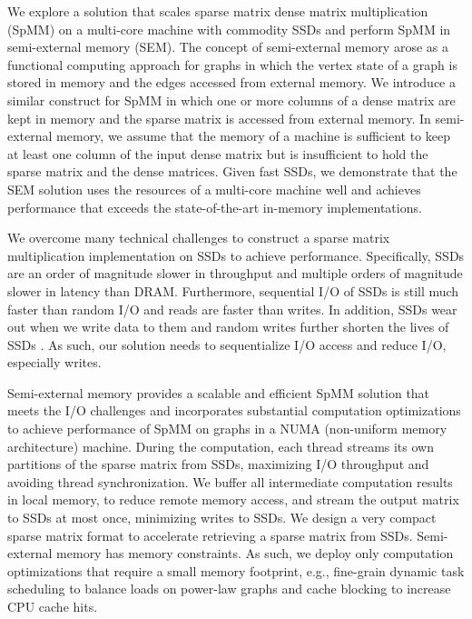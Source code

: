 We explore a solution that scales sparse matrix dense matrix multiplication
(SpMM) on a multi-core machine with commodity SSDs and
perform SpMM in semi-external memory (SEM). The concept of semi-external memory
arose as a functional computing approach for graphs \cite{Abello98} in which
the vertex state of a graph is stored in memory and the edges accessed from
external memory. We introduce a similar construct for SpMM in which one or more
columns of a dense matrix are kept in memory and the sparse matrix is accessed
from external memory. In semi-external memory, we assume
that the memory of a machine is sufficient to keep at least one column
of the input dense matrix but is insufficient to hold the sparse matrix
and the dense matrices. Given fast SSDs, we demonstrate that the SEM
solution uses the resources of a multi-core machine well and
achieves performance that exceeds the state-of-the-art in-memory implementations.


We overcome many technical challenges to construct a sparse matrix
multiplication implementation on SSDs to achieve performance. Specifically,
SSDs are an order of magnitude slower in throughput and multiple orders of
magnitude slower in latency than DRAM. Furthermore, sequential I/O of SSDs
is still much faster
than random I/O \cite{safs} and reads are faster than writes. In addition,
SSDs wear out when we write data to them and random writes further shorten
the lives of SSDs \cite{sfs}. As such, our solution needs to sequentialize
I/O access and reduce I/O, especially writes.

Semi-external memory provides a scalable and efficient SpMM solution that
meets the I/O challenges and incorporates substantial computation optimizations
to achieve performance of SpMM on graphs in a NUMA (non-uniform memory
architecture) machine. During the computation, each
thread streams its own partitions of the sparse matrix from SSDs, maximizing
I/O throughput and avoiding thread synchronization. We buffer all
intermediate computation results in local memory, to reduce remote memory
access, and stream the output matrix to SSDs at most once, minimizing writes
to SSDs. We design a very compact sparse matrix format to accelerate retrieving
a sparse matrix from SSDs. Semi-external memory has memory constraints.
As such, we deploy only computation optimizations that require a small memory
footprint, e.g., fine-grain dynamic task scheduling to balance loads on
power-law graphs and cache blocking to increase CPU cache hits.

